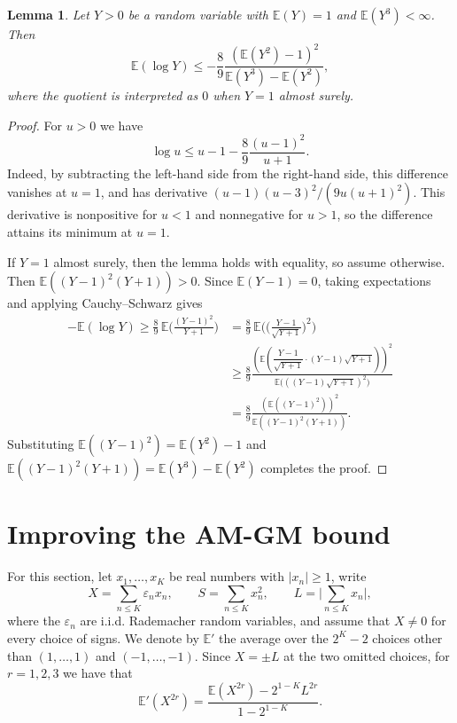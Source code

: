 \documentclass[reqno,12pt]{amsart}
\newtheorem{lemma}[theorem]{Lemma}
\theoremstyle{remark}
\newcommand{\EE}{\mathbb{E}}
\begin{document}
\begin{lemma}\label{lemma geometric mean}
Let $Y > 0$ be a random variable with $\EE(Y)=1$ and $\EE(Y^3)<\infty$. Then
$$ \EE(\log Y)\leq-\frac{8}{9}\frac{(\EE(Y^2)-1)^2}{\EE(Y^3)-\EE(Y^2)}, $$
where the quotient is interpreted as $0$ when $Y=1$ almost surely.
\end{lemma}
\begin{proof}
For $u>0$ we have
$$ \log u\leq u-1-\frac{8}{9}\frac{(u-1)^2}{u+1}. $$
Indeed, by subtracting the left-hand side from the right-hand side, this difference vanishes at $u=1$, and has derivative $(u-1)(u-3)^2/(9u(u+1)^2)$. This derivative is nonpositive for $u<1$ and nonnegative for $u>1$, so the difference attains its minimum at $u=1$.

If $Y=1$ almost surely, then the lemma holds with equality, so assume otherwise. Then $\EE((Y-1)^2(Y+1))>0$. Since $\EE(Y-1)=0$, taking expectations and applying Cauchy--Schwarz gives
\begin{align*}
-\EE(\log Y) \geq\frac{8}{9}\,\EE\bigg(\frac{(Y-1)^2}{Y+1}\bigg) &= \frac{8}{9}\,\EE\bigg(\bigg(\frac{Y-1}{\sqrt{Y+1}}\bigg)^2\bigg) \\
&\geq\frac{8}{9} \frac{\left(\EE\left(\dfrac{Y-1}{\sqrt{Y+1}}\cdot(Y-1)\sqrt{Y+1}\right)\right)^2}{\EE\big(((Y-1)\sqrt{Y+1})^2\big)}\\
&=\frac{8}{9} \frac{(\EE((Y-1)^2))^2}{\EE((Y-1)^2(Y+1))}.
\end{align*}
Substituting $\EE((Y-1)^2)=\EE(Y^2)-1$ and $\EE((Y-1)^2(Y+1)) = \EE(Y^3)-\EE(Y^2)$ completes the proof.
\end{proof}

\section{Improving the AM-GM bound}\label{section amgm}

For this section, let $x_1,\ldots,x_K$ be real numbers with $|x_n|\geq1$, write
$$ X=\sum_{n\leq K}\varepsilon_n x_n,\qquad S=\sum_{n\leq K}x_n^2,\qquad L=\bigg|\sum_{n\leq K}x_n\bigg|, $$
where the $\varepsilon_n$ are i.i.d. Rademacher random variables, and assume that $X\neq0$ for every choice of signs. We denote by $\EE'$ the average over the $2^K-2$ choices other than $(1,\ldots,1)$ and $(-1,\ldots,-1)$. Since $X=\pm L$ at the two omitted choices, for $r=1,2,3$ we have that
\begin{equation}\label{equation conditional moments}
\EE'(X^{2r}) = \frac{\EE(X^{2r})-2^{1-K}L^{2r}}{1-2^{1-K}}.
\end{equation}
\end{document}
